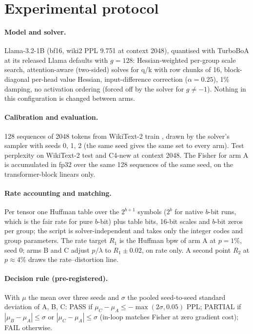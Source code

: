 \documentclass{article}
\begin{document}
\section{Experimental protocol}
\label{sec:protocol}

\paragraph{Model and solver.} Llama-3.2-1B \citep{grattafiori2024llama3}
(bf16, wiki2 PPL 9.751 at context 2048), quantised with TurboBoA
\citep{kim2025boa} at its released Llama defaults with $g{=}128$:
Hessian-weighted per-group scale search, attention-aware (two-sided)
solves for q/k with row chunks of 16, block-diagonal per-head value
Hessian, input-difference correction ($\alpha = 0.25$), 1\% damping, no
activation ordering (forced off by the solver for $g \neq -1$). Nothing
in this configuration is changed between arms.

\paragraph{Calibration and evaluation.} 128 sequences of 2048 tokens from
WikiText-2 train \citep{merity2017wikitext}, drawn by the solver's sampler
with seeds 0, 1, 2 (the same seed gives the same set to every arm). Test
perplexity on WikiText-2 test and C4-new \citep{raffel2020c4} at context
2048. The Fisher for arm A is accumulated in fp32 over the same 128
sequences of the same seed, on the transformer-block linears only.

\paragraph{Rate accounting and matching.} Per tensor one Huffman table
over the $2^{b+1}$ symbols ($2^b$ for native $b$-bit runs, which is the
fair rate for pure $b$-bit) plus table bits, 16-bit scales and $b$-bit
zeros per group; the script is solver-independent and takes only the
integer codes and group parameters. The rate target $R_1$ is the Huffman
bpw of arm A at $p = 1\%$, seed 0; arms B and C adjust $p/\lambda$ to
$R_1 \pm 0.02$, on rate only. A second point $R_2$ at $p \approx 4\%$
draws the rate--distortion line.

\paragraph{Decision rule (pre-registered).} With $\mu$ the mean over
three seeds and $\sigma$ the pooled seed-to-seed standard deviation of A,
B, C: PASS if $\mu_C - \mu_A \le -\max(2\sigma, 0.05)$ PPL; PARTIAL if
$|\mu_B - \mu_A| \le \sigma$ or $|\mu_C - \mu_A| \le \sigma$ (in-loop
matches Fisher at zero gradient cost); FAIL otherwise.
\end{document}

